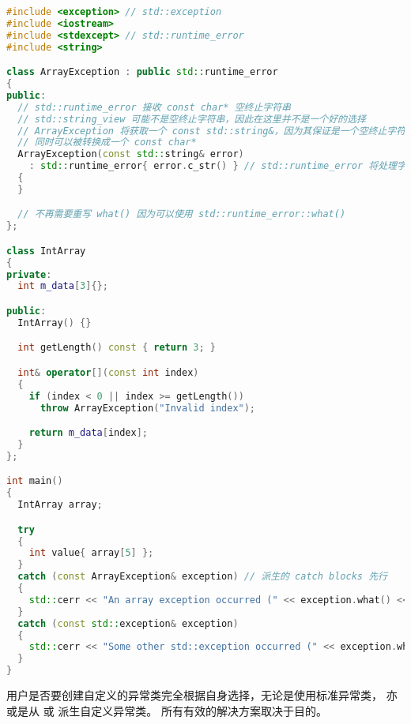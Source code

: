 \documentclass[../../LearnCpp.tex]{subfiles}
\begin{document}
\begin{lstlisting}[language=C++]
#include <exception> // std::exception
#include <iostream>
#include <stdexcept> // std::runtime_error
#include <string>

class ArrayException : public std::runtime_error
{
public:
  // std::runtime_error 接收 const char* 空终止字符串
  // std::string_view 可能不是空终止字符串，因此在这里并不是一个好的选择
  // ArrayException 将获取一个 const std::string&，因为其保证是一个空终止字符串，
  // 同时可以被转换成一个 const char*
  ArrayException(const std::string& error)
    : std::runtime_error{ error.c_str() } // std::runtime_error 将处理字符串
  {
  }

  // 不再需要重写 what() 因为可以使用 std::runtime_error::what()
};

class IntArray
{
private:
  int m_data[3]{};

public:
  IntArray() {}

  int getLength() const { return 3; }

  int& operator[](const int index)
  {
    if (index < 0 || index >= getLength())
      throw ArrayException("Invalid index");

    return m_data[index];
  }
};

int main()
{
  IntArray array;

  try
  {
    int value{ array[5] };
  }
  catch (const ArrayException& exception) // 派生的 catch blocks 先行
  {
    std::cerr << "An array exception occurred (" << exception.what() << ")\n";
  }
  catch (const std::exception& exception)
  {
    std::cerr << "Some other std::exception occurred (" << exception.what() << ")\n";
  }
}
\end{lstlisting}

用户是否要创建自定义的异常类完全根据自身选择，无论是使用标准异常类，
亦或是从  或  派生自定义异常类。
所有有效的解决方案取决于目的。
\end{document}
